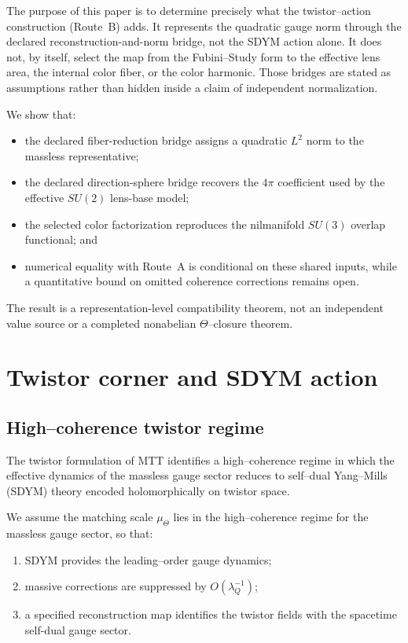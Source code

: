 \documentclass[11pt]{article}
\begin{document}
The purpose of this paper is to determine precisely what the twistor--action
construction (Route~B) adds. It represents the quadratic gauge norm through
the declared reconstruction-and-norm bridge, not the SDYM action alone.
It does not, by itself, select
the map from the Fubini--Study form to the effective lens area, the internal
color fiber, or the color harmonic. Those bridges are stated as assumptions
rather than hidden inside a claim of independent normalization.

We show that:
\begin{itemize}
\item the declared fiber-reduction bridge assigns a quadratic $L^2$ norm
to the massless representative;
\item the declared direction-sphere bridge recovers the $4\pi$ coefficient
used by the effective $SU(2)$ lens-base model;
\item the selected color factorization reproduces the nilmanifold $SU(3)$
overlap functional; and
\item numerical equality with Route~A is conditional on these shared inputs,
while a quantitative bound on omitted coherence corrections remains open.
\end{itemize}

The result is a representation-level compatibility theorem, not an
independent value source or a completed nonabelian $\Theta$--closure theorem.

\section{Twistor corner and SDYM action}

\subsection{High--coherence twistor regime}

The twistor formulation of MTT identifies a high--coherence regime in which the
effective dynamics of the massless gauge sector reduces to self--dual Yang--Mills
(SDYM) theory encoded holomorphically on twistor space.

\begin{assumption}
We assume the matching scale $\mu_\Theta$ lies in the high--coherence regime
for the massless gauge sector, so that:
\begin{enumerate}
\item SDYM provides the leading--order gauge dynamics;
\item massive corrections are suppressed by $O(\lambda_Q^{-1})$;
\item a specified reconstruction map identifies the twistor fields with the
spacetime self-dual gauge sector.
\end{enumerate}
\end{assumption}
\end{document}
